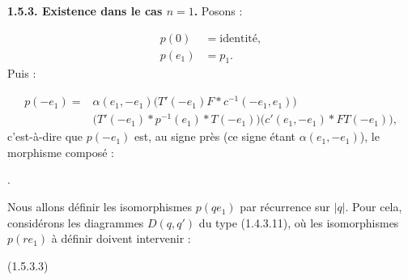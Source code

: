 %
\noindent\textbf{1.5.3. Existence dans le cas $n=1$.}\quad
Posons :

\begin{equation}
  \begin{aligned}
    p(0)&=\text{identité},\\
    p(e_1)&=p_1.
  \end{aligned}
  \tag{1.5.3.1}
\end{equation}
Puis :

\begin{equation}
  \begin{aligned}
    p(-e_1)={}&\alpha(e_1,-e_1)
      \bigl(T'(-e_1)F*c^{-1}(-e_1,e_1)\bigr)\\
      &{}\bigl(T'(-e_1)*p^{-1}(e_1)*T(-e_1)\bigr)
      \bigl(c'(e_1,-e_1)*FT(-e_1)\bigr),
  \end{aligned}
  \tag{1.5.3.2}
\end{equation}
c'est-à-dire que $p(-e_1)$ est, au signe près (ce signe étant
$\alpha(e_1,-e_1)$), le morphisme composé :

\begin{center}
  \;.
\end{center}

Nous allons définir les isomorphismes $p(qe_1)$ par récurrence sur
$|q|$. Pour cela, considérons les diagrammes $D(q,q')$ du type
(1.4.3.11), où les isomorphismes $p(re_1)$ à définir doivent
intervenir :

\begin{center}
  \hfill\textup{(1.5.3.3)}
\end{center}

